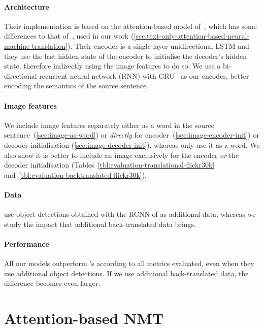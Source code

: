 \documentclass[11pt,twocolumn]{article}
\begin{document}
\paragraph{Architecture}
Their implementation is based on the attention-based model of~, which has some differences to that of~, used in our work (\cref{sec:text-only-attention-based-neural-machine-translation}).
Their encoder is a single-layer unidirectional LSTM and they use the last hidden state of the encoder to initialise the decoder's hidden state, therefore indirectly using the image features to do so.
We use a bi-directional recurrent neural network (RNN) with GRU~\cite{Choetal2014b} as our encoder, better encoding the semantics of the source sentence.

\paragraph{Image features}
We include image features separately either as a word in the source sentence~(\cref{sec:image-as-word}) or \emph{directly} for encoder~(\cref{sec:image-encoder-init}) or decoder initialisation (\cref{sec:image-decoder-init}), whereas  only use it as a word.
We also
show it is better to include an image exclusively for the encoder \emph{or} the decoder initialisation (Tables~\ref{tbl:evaluation-translational-flickr30k} and~\ref{tbl:evaluation-backtranslated-flickr30k}).

\paragraph{Data}
 use object detections obtained with the RCNN of  as additional data, whereas
we study the impact that additional back-translated data brings.

\paragraph{Performance}
All our models outperform 's according to all metrics evaluated, even when they use additional object detections.
If we use additional back-translated data, the difference becomes even larger.

\section{Attention-based NMT}
\label{sec:attention-based-neural-machine-translation}
\end{document}
